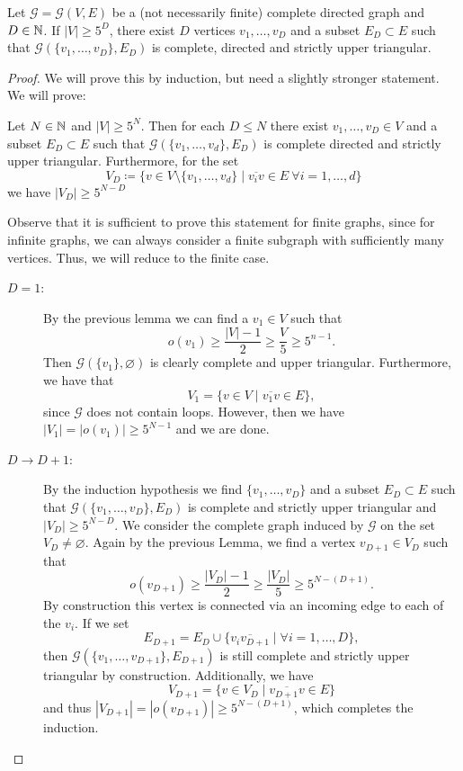 \begin{lemma}[{\cite[Lemma~A.8]{MR3509968}}]
  \label{lem:A.8}
  Let \(\mathcal{G} = \mathcal{G}(V,E)\) be a (not necessarily finite) complete directed graph and \(D \in \mathbb{N}\). If \(|V| \geq 5^D\), there exist \(D\) vertices \(v_1, \dots, v_D\) and a subset \(E_D \subset E\) such that \(\mathcal{G}(\{v_1, \dots, v_D\}, E_D)\) is complete, directed and strictly upper triangular.
\end{lemma}

\begin{proof}
  We will prove this by induction, but need a slightly stronger statement. We will prove:

  Let \(N \in \mathbb{N}\) and \(|V| \geq 5^N\). Then for each \(D \leq N\) there exist \(v_1,\dots, v_D \in V\) and a subset \(E_D \subset E\) such that \(\mathcal{G}(\{v_1, \dots, v_d\}, E_D)\) is complete directed and strictly upper triangular. Furthermore, for the set
  \[
    V_D \coloneqq \{v \in V \setminus \{v_1, \dots, v_d\} \mid \overline{v_iv} \in E\ \forall i =1,\dots, d\}
  \]
  we have \(|V_D| \geq 5^{N-D}\)

  Observe that it is sufficient to prove this statement for finite graphs, since for infinite graphs, we can always consider a finite subgraph with sufficiently many vertices. Thus, we will reduce to the finite case.
  \begin{description}
  \item[\(D = 1\):] By the previous lemma we can find a \(v_1 \in V\) such that
    \[
      o(v_1) \geq \frac{|V| - 1}{2} \geq \frac{V}{5} \geq 5^{n-1}.
    \]
    Then \(\mathcal{G}(\{v_1\}, \varnothing)\) is clearly complete and upper triangular. Furthermore, we have that
    \[
      V_1 = \{v \in V \mid \overline{v_1v} \in E\},
    \]
    since \(\mathcal{G}\) does not contain loops. However, then we have \(|V_1| = |o(v_1)| \geq 5^{N-1}\) and we are done.
  \item[\(D \to D+1\):] By the induction hypothesis we find \(\{v_1, \dots, v_D\}\) and a subset \(E_D \subset E\) such that \(\mathcal{G}(\{v_1, \dots, v_D\}, E_D)\) is complete and strictly upper triangular and \(|V_D| \geq 5^{N-D}\). We consider the complete graph induced by \(\mathcal{G}\) on the set \(V_D \neq \varnothing\). Again by the previous Lemma, we find a vertex \(v_{D+1} \in V_D\) such that
    \[
      o(v_{D+1}) \geq \frac{|V_D| -1}{2} \geq \frac{|V_D|}{5} \geq 5^{N - (D+1)}.
    \]
    By construction this vertex is connected via an incoming edge to each of the \(v_i\). If we set
    \[
      E_{D+1} = E_D \cup \{\overline{v_iv_{D+1}} \mid \forall i = 1, \dots, D\},
    \]
    then \(\mathcal{G}(\{v_1, \dots, v_{D+1}\}, E_{D+1})\) is still complete and strictly upper triangular by construction. Additionally, we have
    \[
      V_{D+1} = \{v \in V_D \mid \overline{v_{D+1}v} \in E\}
    \]
    and thus \(|V_{D+1}| = |o(v_{D+1})| \geq 5^{N- (D+1)}\), which completes the induction.
  \end{description}
\end{proof}

